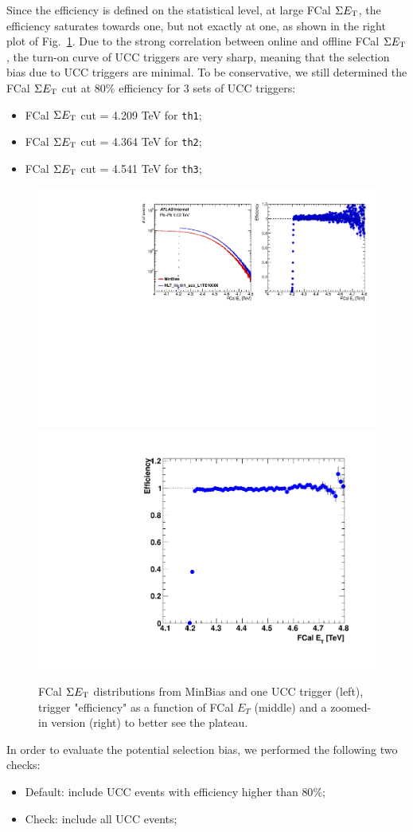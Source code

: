 Since the efficiency is defined on the statistical level, at large FCal $\Sigma E_\text{T}$, the efficiency saturates towards one, but not exactly at one, as shown in the right plot of Fig.~\ref{fig:appendix_trigger_eg}. Due to the strong correlation between online and offline FCal $\Sigma E_\text{T}$, the turn-on curve of UCC triggers are very sharp, meaning that the selection bias due to UCC triggers are minimal. To be conservative, we still determined the FCal $\Sigma E_\text{T}$ cut at $80\%$ efficiency for 3 sets of UCC triggers:
\begin{itemize}
\item FCal $\Sigma E_\text{T}$ cut = 4.209 TeV for \verb|th1|;
\item FCal $\Sigma E_\text{T}$ cut = 4.364 TeV for \verb|th2|;
\item FCal $\Sigma E_\text{T}$ cut = 4.541 TeV for \verb|th3|;
\end{itemize}

\begin{figure}[H]
\centering
\includegraphics[width=.6\linewidth]{figs/chapter_appendix/trigger_eg1.pdf}
\includegraphics[width=.3\linewidth]{figs/chapter_appendix/trigger_eg2.pdf}
\caption{FCal $\Sigma E_\text{T}$ distributions from MinBias and one UCC trigger (left), trigger "efficiency" as a function of FCal $E_{T}$ (middle) and a zoomed-in version (right) to better see the plateau.}
\label{fig:appendix_trigger_eg}
\end{figure}

In order to evaluate the potential selection bias, we performed the following two checks:
\begin{itemize}
\item Default: include UCC events with efficiency higher than $80\%$;
\item Check: include all UCC events;
\end{itemize}

